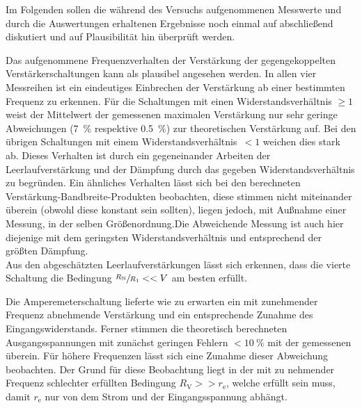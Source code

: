 Im Folgenden sollen die während des Versuchs aufgenommenen Messwerte und durch 
die Auswertungen erhaltenen Ergebnisse noch einmal auf abschließend diskutiert 
und auf Plausibilität hin überprüft werden.

Das aufgenommene Frequenzverhalten der Verstärkung der gegengekoppelten Verstärkerschaltungen 
kann als plausibel angesehen werden. In allen vier Messreihen ist ein eindeutiges Einbrechen
der Verstärkung ab einer bestimmten Frequenz zu erkennen. Für die Schaltungen mit 
einen Widerstandsverhältnis $\geq 1$ weist der Mittelwert der gemessenen maximalen Verstärkung 
nur sehr geringe Abweichungen  (\SI{7}{\percent} respektive \SI{0.5}{\percent}) zur theoretischen 
Verstärkung auf. Bei den übrigen Schaltungen mit einem Widerstandsverhältnis~$<1$ weichen dies stark
ab. Dieses Verhalten ist durch ein gegeneinander Arbeiten der Leerlaufverstärkung und der Dämpfung
durch das gegeben Widerstandsverhältnis zu begründen.
Ein ähnliches Verhalten lässt sich bei den berechneten Verstärkung-Bandbreite-Produkten beobachten,
diese stimmen nicht miteinander überein (obwohl diese konstant sein sollten), liegen jedoch, mit Außnahme
einer Messung, in der selben Größenordnung.Die Abweichende Messung ist auch hier diejenige mit dem geringsten 
Widerstandsverhältnis und entsprechend der größten Dämpfung.\\
Aus den abgeschätzten Leerlaufverstärkungen lässt sich erkennen, dass die vierte Schaltung die
Bedingung $\sfrac{R_{\mathrm{N}}}{R_1} << V$ am besten erfüllt.
 
Die Amperemeterschaltung lieferte wie zu erwarten ein mit zunehmender Frequenz abnehmende Verstärkung 
und ein entsprechende Zunahme des Eingangswiderstands. Ferner stimmen die theoretisch  
berechneten Ausgangsspannungen mit zunächst geringen Fehlern $< \SI{10}{\percent}$ mit der gemessenen überein.
Für höhere Frequenzen lässt sich eine Zunahme dieser Abweichung beobachten. Der Grund für diese Beobachtung liegt in 
der mit zu nehmender Frequenz schlechter erfüllten Bedingung $R_{\mathrm{V}} >> r_{\mathrm{e}}$, welche
erfüllt sein muss, damit $r_{\mathrm{e}}$  nur von dem Strom und der Eingangsspannung abhängt.

